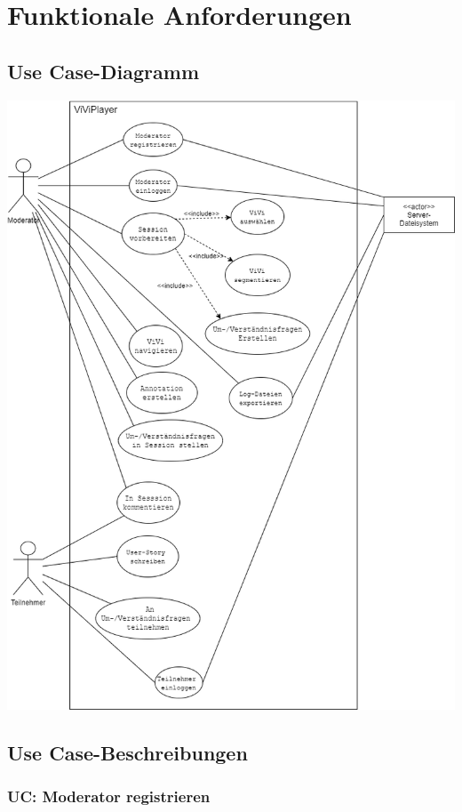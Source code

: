\section{Funktionale Anforderungen}

\subsection{Use Case-Diagramm}
\includegraphics[width=\linewidth]{sections/diagrams/viviplayer-uc-diagramm.png}
\pagebreak

\subsection{Use Case-Beschreibungen}

\subsubsection{UC: Moderator registrieren}

\pagebreak

